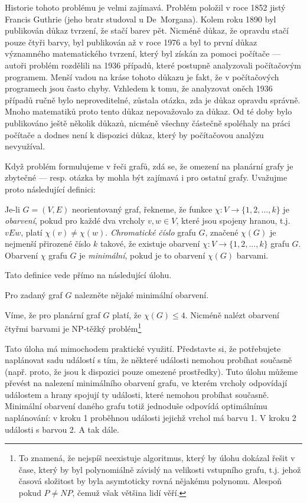 Historie tohoto problému je velmi zajímavá. Problém položil v roce 1852 jistý Francis Guthrie (jeho bratr studoval u De~Morgana). Kolem roku 1890
byl publikován důkaz tvrzení, že stačí barev pět. Nicméně důkaz, že opravdu stačí pouze čtyři barvy, byl publikován až v roce 1976 a byl to první
důkaz významného matematického tvrzení, který byl získán za pomoci počítače --- autoři problém rozdělili na 1936 případů, které postupně analyzovali
počítačovým programem. Menší vadou na kráse tohoto důkazu je fakt, že v počítačových programech jsou často chyby. Vzhledem k tomu, že 
analyzovat oněch 1936 případů ručně bylo neproveditelné, zůstala otázka, zda je důkaz opravdu správně. Mnoho matematiků proto tento důkaz nepovažovalo
za důkaz. Od té doby bylo publikováno ještě několik důkazů, nicméně všechny částečně spoléhaly na práci počítače a dodnes není k dispozici důkaz, který
by počítačovou analýzu nevyužíval.

Když problém formulujeme v řeči grafů, zdá se, že omezení na planární grafy je zbytečné --- resp. otázka by mohla být zajímavá i pro ostatní grafy. Uvažujme proto následující
definici:

\begin{definition} Je-li $G=(V,E)$ neorientovaný graf, řekneme, že funkce $\chi: V\to \{1,2,\ldots, k\}$ je \emph{obarvení}, pokud pro každé dva vrcholy $v,w\in V$,
které jsou spojeny hranou, t.j. $vEw$, platí $\chi(v)\neq \chi(w)$. \emph{Chromatické číslo} grafu $G$, značené $\chi(G)$ je nejmenší přirozené číslo $k$ takové, 
že existuje obarvení $\chi:V\to\{1,2,\ldots,k\}$ grafu $G$. Obarvení $\chi$ grafu $G$ je \emph{minimální}, pokud je to obarvení $\chi(G)$ barvami.
\end{definition}

Tato definice vede přímo na následující úlohu.

\begin{question}\label{uloha:minimalcoloring} Pro zadaný graf $G$ nalezněte nějaké minimální obarvení.
\end{question}

Víme, že pro planární graf $G$ platí, že $\chi(G)\leq 4$. Nicméně nalézt obarvení čtyřmi barvami je NP-těžký problém\footnote{To znamená, že nejspíš neexistuje
algoritmus, který by úlohu dokázal řešit v čase, který by byl polynomiálně závislý na velikosti vstupního grafu, t.j. jehož časová složitost by byla asymtoticky rovná nějakému polynomu. Alespoň pokud $P\neq NP$, čemuž však většina lidí věří.}

Tato úloha má mimochodem praktické využití. Představte si, že potřebujete naplánovat sadu událostí s tím, že některé události nemohou probíhat současně (např. proto, že
jsou k dispozici pouze omezené prostředky). Tuto úlohu můžeme převést na nalezení minimálního obarvení grafu, ve kterém vrcholy odpovídají událostem a hrany spojují
ty události, které nemohou probíhat současně. Minimální obarvení daného grafu totiž jednoduše odpovídá optimálnímu naplánování: v kroku 1 proběhnou události
jejichž vrchol má barvu 1. V kroku 2 události s barvou 2. A tak dále. 

